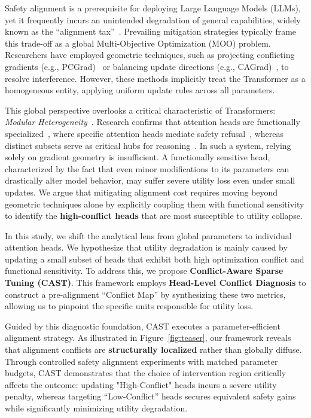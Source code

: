\documentclass[11pt]{article}
\begin{document}
Safety alignment is a prerequisite for deploying Large Language Models (LLMs), yet it frequently incurs an unintended degradation of general capabilities, widely known as the ``alignment tax''~\cite{ouyang2022training, touvron2023llama2}. Prevailing mitigation strategies typically frame this trade-off as a global Multi-Objective Optimization (MOO) problem. Researchers have employed geometric techniques, such as projecting conflicting gradients (e.g., PCGrad)~\cite{yu2020gradient} or balancing update directions (e.g., CAGrad)~\cite{liu2024conflict}, to resolve interference. However, these methods implicitly treat the Transformer as a homogeneous entity, applying uniform update rules across all parameters.

This global perspective overlooks a critical characteristic of Transformers: \textit{Modular Heterogeneity}~\cite{voita2019analyzing, michel2019sixteen}. Research confirms that attention heads are functionally specialized~\cite{clark2019doesbert, vig2019multiscale}, where specific attention heads mediate safety refusal~\cite{zhou2025roleattentionheadslarge}, whereas distinct subsets serve as critical hubs for reasoning~\cite{wang2022interpretability}. In such a system, relying solely on gradient geometry is insufficient. A functionally sensitive head, characterized by the fact that even minor modifications to its parameters can drastically alter model behavior, may suffer severe utility loss even under small updates. We argue that mitigating alignment cost requires moving beyond geometric techniques alone by explicitly coupling them with functional sensitivity to identify the \textbf{high-conflict heads} that are most susceptible to utility collapse.

In this study, we shift the analytical lens from global parameters to individual attention heads. We hypothesize that utility degradation is mainly caused by updating a small subset of heads that exhibit both high optimization conflict and functional sensitivity. To address this, we propose \textbf{Conflict-Aware Sparse Tuning (CAST)}. This framework employs \textbf{Head-Level Conflict Diagnosis} to construct a pre-alignment ``Conflict Map'' by synthesizing these two metrics, allowing us to pinpoint the specific units responsible for utility loss.

Guided by this diagnostic foundation, CAST executes a parameter-efficient alignment strategy. As illustrated in Figure~\ref{fig:teaser}, our framework reveals that alignment conflicts are \textbf{structurally localized} rather than globally diffuse. Through controlled safety alignment experiments with matched parameter budgets, CAST demonstrates that the choice of intervention region critically affects the outcome: updating "High-Conflict" heads incurs a severe utility penalty, whereas targeting ``Low-Conflict'' heads secures equivalent safety gains while significantly minimizing utility degradation.
\end{document}
